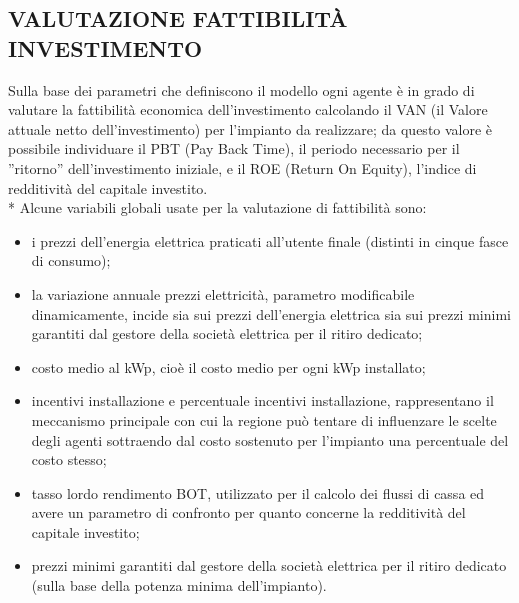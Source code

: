 \documentclass[12pt,a4paper,openright,twoside]{report}
\begin{document}
\subsection{VALUTAZIONE FATTIBILITÀ INVESTIMENTO}
Sulla base dei parametri che definiscono il modello ogni agente è in grado di valutare la fattibilità economica dell'investimento calcolando il VAN (il Valore attuale netto dell'investimento) per l'impianto da realizzare; da questo valore è possibile individuare il PBT (Pay Back Time), il periodo necessario per il ''ritorno'' dell'investimento iniziale, e il ROE (Return On Equity), l'indice di redditività del capitale investito.\\*
Alcune variabili globali usate per la valutazione di fattibilità sono:
\begin{itemize}
\item i prezzi dell'energia elettrica praticati all'utente finale (distinti in cinque fasce di consumo);
\item la variazione annuale prezzi elettricità, parametro modificabile dinamicamente, incide sia sui prezzi dell'energia elettrica sia sui prezzi minimi garantiti dal gestore della società elettrica per il ritiro dedicato;
\item costo medio al kWp, cioè il costo medio per ogni kWp installato;
\item incentivi installazione e percentuale incentivi installazione, rappresentano il meccanismo principale con cui la regione può tentare di influenzare le scelte degli agenti sottraendo dal costo sostenuto per l'impianto una percentuale del costo stesso;
\item tasso lordo rendimento BOT, utilizzato per il calcolo dei flussi di cassa ed avere un parametro di confronto per quanto concerne la redditività del capitale investito;
\item prezzi minimi garantiti dal gestore della società elettrica per il ritiro dedicato (sulla base della potenza minima dell'impianto).
\end{itemize}
\end{document}
